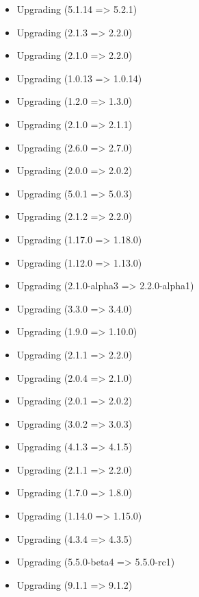\begin{itemize}
    \item Upgrading  (5.1.14 => 5.2.1)
    \item Upgrading  (2.1.3 => 2.2.0)
    \item Upgrading  (2.1.0 => 2.2.0)
    \item Upgrading  (1.0.13 => 1.0.14)
    \item Upgrading  (1.2.0 => 1.3.0)
    \item Upgrading  (2.1.0 => 2.1.1)
    \item Upgrading  (2.6.0 => 2.7.0)
    \item Upgrading  (2.0.0 => 2.0.2)
    \item Upgrading  (5.0.1 => 5.0.3)
    \item Upgrading  (2.1.2 => 2.2.0)
    \item Upgrading  (1.17.0 => 1.18.0)
    \item Upgrading  (1.12.0 => 1.13.0)
    \item Upgrading  (2.1.0-alpha3 => 2.2.0-alpha1)
    \item Upgrading  (3.3.0 => 3.4.0)
    \item Upgrading  (1.9.0 => 1.10.0)
    \item Upgrading  (2.1.1 => 2.2.0)
    \item Upgrading  (2.0.4 => 2.1.0)
    \item Upgrading  (2.0.1 => 2.0.2)
    \item Upgrading  (3.0.2 => 3.0.3)
    \item Upgrading  (4.1.3 => 4.1.5)
    \item Upgrading  (2.1.1 => 2.2.0)
    \item Upgrading  (1.7.0 => 1.8.0)
    \item Upgrading  (1.14.0 => 1.15.0)
    \item Upgrading  (4.3.4 => 4.3.5)
    \item Upgrading  (5.5.0-beta4 => 5.5.0-rc1)
    \item Upgrading  (9.1.1 => 9.1.2)
\end{itemize}
